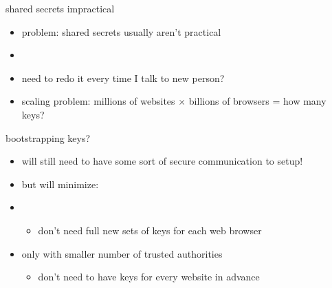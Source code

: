 \begin{frame}[fragile,label=sharedSecretProblem]{shared secrets impractical}
    \begin{itemize}
    \item problem: shared secrets usually aren't practical
    \vspace{.5cm}
    \item {}
    \item need to redo it every time I talk to new person?
    \item scaling problem: millions of websites $\times$ billions of browsers = how many keys?
    \end{itemize}
\end{frame}

\begin{frame}{bootstrapping keys?}
    \begin{itemize}
    \item will still need to have some sort of secure communication to setup!
    \item but will minimize:
    \vspace{.5cm}
    \item<2-> 
        \begin{itemize}
        \item don't need full new sets of keys for each web browser
        \end{itemize}
    \item<2-> only with smaller number of trusted authorities
        \begin{itemize}
        \item don't need to have keys for every website in advance
        \end{itemize}
    \end{itemize}
\end{frame}
